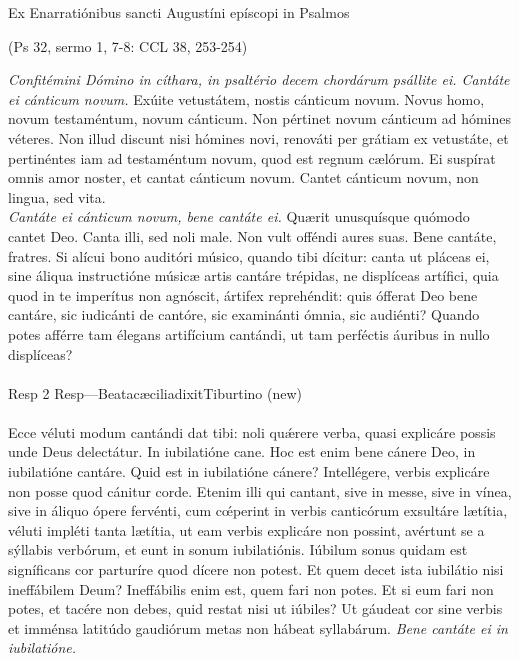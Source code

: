 \documentclass[options]{article}
\begin{document}
	Ex Enarratiónibus sancti Augustíni epíscopi in Psalmos
	\begin{flushright}
			 (Ps 32, sermo 1, 7-8: CCL 38, 253-254)
	\end{flushright}
\emph{Confitémini Dómino in cíthara, in psaltério decem chordárum psállite ei. Cantáte ei cánticum novum.}
 Exúite vetustátem, nostis cánticum novum. Novus homo, novum testaméntum, novum cánticum. Non pértinet novum cánticum ad hómines véteres. Non illud discunt nisi hómines novi, renováti per grátiam ex vetustáte, et pertinéntes iam ad testaméntum novum, quod est regnum cælórum. Ei suspírat omnis amor noster, et cantat cánticum novum. Cantet cánticum novum, non lingua, sed vita.\\
 
	\emph{Cantáte ei cánticum novum, bene cantáte ei.} Quærit unusquísque quómodo cantet Deo. Canta illi, sed noli male. Non vult offéndi aures suas. Bene cantáte, fratres. Si alícui bono auditóri músico, quando tibi dícitur: canta ut pláceas ei, sine áliqua instructióne músicæ artis cantáre trépidas, ne displíceas artífici, quia quod in te imperítus non agnóscit, ártifex reprehéndit: quis ófferat Deo bene cantáre, sic iudicánti de cantóre, sic examinánti ómnia, sic audiénti? Quando potes afférre tam élegans artifícium cantándi, ut tam perféctis áuribus in nullo displíceas?
	\\
	\\
	Resp 2 Resp—BeatacæciliadixitTiburtino  (new)
	\\
	\\
		
	Ecce véluti modum cantándi dat tibi: noli qu\'{æ}rere verba, quasi explicáre possis unde Deus delectátur. In iubilatióne cane. Hoc est enim bene cánere Deo, in iubilatióne cantáre. Quid est in iubilatióne cánere? Intellégere, verbis explicáre non posse quod cánitur corde. Etenim illi qui cantant, sive in messe, sive in vínea, sive in áliquo ópere fervénti, cum c\'{œ}perint in verbis canticórum exsultáre lætítia, véluti impléti tanta lætítia, ut eam verbis explicáre non possint, avértunt se a sýllabis verbórum, et eunt in sonum iubilatiónis.
	Iúbilum sonus quidam est signíficans cor parturíre quod dícere non potest. Et quem decet ista iubilátio nisi ineffábilem Deum? Ineffábilis enim est, quem fari non potes. Et si eum fari non potes, et tacére non debes, quid restat nisi ut iúbiles? Ut gáudeat cor sine verbis et imménsa latitúdo gaudiórum metas non hábeat syllabárum. 
	\emph{Bene cantáte ei in iubilatióne.}
\end{document}

